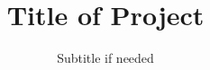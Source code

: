\newcommand{\Faculty}{Faculty of Engineering}
\newcommand{\ThesisType}{Final Year Project Report}
\newcommand{\DegreeType}{Bachelor of Civil Engineering}

\newcommand{\AuthorA}{LastName1, FirstNames1}	%
\newcommand{\AuthorAID}{Registration Number}	%
\newcommand{\AuthorB}{LastName2, FirstNames2}  	%
\newcommand{\AuthorBID}{Registration Number}	
\publishers{Supervisors: SupervisorName1, SupervisorName2}  %

\title{Title of Project}						%
\subtitle{Subtitle if needed}					%

